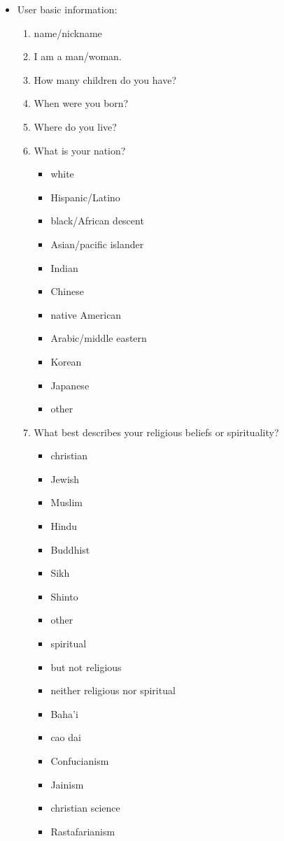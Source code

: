 \begin{appendices}
		\begin{itemize}
		\item User basic information:
		\begin{enumerate}
			\item name/nickname
			\item I am a man/woman.
			\item How many children do you have?
			\item When were you born?
			\item Where do you live?
			\item What is your nation?
			\begin{itemize}
				\item white
				\item Hispanic/Latino
				\item black/African descent
				\item Asian/pacific islander
				\item Indian
				\item Chinese			
				\item native American
				\item Arabic/middle eastern
				\item Korean
				\item Japanese
				\item other
			\end{itemize}
			\item What best describes your religious beliefs or spirituality?
			\begin{itemize}
				\item christian
				\item Jewish
				\item Muslim
				\item Hindu
				\item Buddhist
				\item Sikh
				\item Shinto
				\item other
				\item spiritual
				\item but not religious
				\item neither religious nor spiritual
				\item Baha'i
				\item cao dai
				\item Confucianism
				\item Jainism
				\item christian science
				\item Rastafarianism

\end{itemize}
\end{enumerate}
\end{itemize}
\end{appendices}
